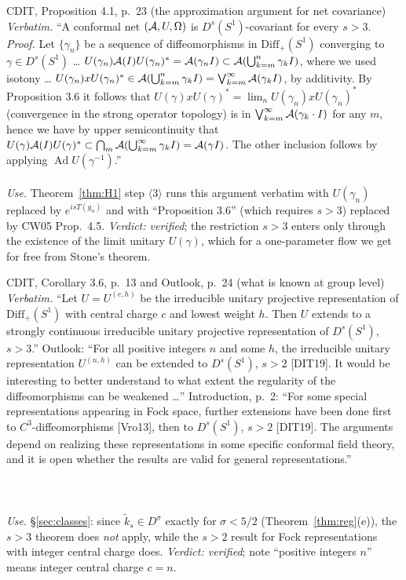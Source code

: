 \documentclass[11pt]{article}
\newcommand{\Om}{\Omega}
\newcommand{\Diff}{\mathrm{Diff}_+}
\newcommand{\ktil}{\widetilde k}
\newcommand{\Ad}{\operatorname{Ad}}
\begin{document}
\begin{citedbox}{CDIT, Proposition 4.1, p.~23 (the approximation argument for net covariance)}
\emph{Verbatim.}  ``A conformal net $(\cA,U,\Om)$ is $D^s(S^1)$-covariant for every $s>3$.  \emph{Proof.} Let
$\{\gamma_n\}$ be a sequence of diffeomorphisms in $\Diff(S^1)$ converging to $\gamma\in D^s(S^1)$ \dots
$U(\gamma_n)\mathcal A(I)U(\gamma_n)^*=\mathcal A(\gamma_nI)\subset\mathcal A(\bigcup_{k=m}^n\gamma_kI)$, where we used isotony \dots
$U(\gamma_n)xU(\gamma_n)^*\in\mathcal A(\bigcup_{k=m}^n\gamma_kI)=\bigvee_{k=m}^\infty\mathcal A(\gamma_kI)$, by additivity.
By Proposition 3.6 it follows that $U(\gamma)xU(\gamma)^*=\lim_nU(\gamma_n)xU(\gamma_n)^*$ (convergence in the strong
operator topology) is in $\bigvee_{k=m}^\infty\mathcal A(\gamma_k\cdot I)$ for any $m$, hence we have by upper semicontinuity
that $U(\gamma)\mathcal A(I)U(\gamma)^*\subset\bigcap_m\mathcal A(\bigcup_{k=m}^\infty\gamma_kI)=\mathcal A(\gamma I)$.  The other inclusion
follows by applying $\Ad U(\gamma^{-1})$.''\\[2pt]
\\[2pt]
\emph{Use.}  Theorem~\ref{thm:H1} step $\langle3\rangle$ runs this argument verbatim with $U(\gamma_n)$ replaced by
$e^{isT(g_n)}$ and with ``Proposition 3.6'' (which requires $s>3$) replaced by CW05 Prop.~4.5.
\emph{Verdict: verified}; the restriction $s>3$ enters only through the existence of the limit unitary $U(\gamma)$,
which for a one-parameter flow we get for free from Stone's theorem.
\end{citedbox}

\begin{citedbox}{CDIT, Corollary 3.6, p.~13 and Outlook, p.~24 (what is known at group level)}
\emph{Verbatim.}  ``Let $U=U^{(c,h)}$ be the irreducible unitary projective representation of $\Diff(S^1)$ with central
charge $c$ and lowest weight $h$.  Then $U$ extends to a strongly continuous irreducible unitary projective
representation of $D^s(S^1)$, $s>3$.''  Outlook: ``For all positive integers $n$ and some $h$, the irreducible unitary
representation $U^{(n,h)}$ can be extended to $D^s(S^1)$, $s>2$ [DIT19].  It would be interesting to better understand
to what extent the regularity of the diffeomorphisms can be weakened \dots''  Introduction, p.~2: ``For some special
representations appearing in Fock space, further extensions have been done first to $C^3$-diffeomorphisms [Vro13], then
to $D^s(S^1)$, $s>2$ [DIT19].  The arguments depend on realizing these representations in some specific conformal field
theory, and it is open whether the results are valid for general representations.''\\[2pt]
\\
\\
\\[2pt]
\emph{Use.}  \S\ref{sec:classes}: since $\ktil_s\in D^\sigma$ exactly for $\sigma<5/2$ (Theorem~\ref{thm:reg}(e)),
the $s>3$ theorem does \emph{not} apply, while the $s>2$ result for Fock representations with integer central charge
does.  \emph{Verdict: verified}; note ``positive integers $n$'' means integer central charge $c=n$.
\end{citedbox}
\end{document}
